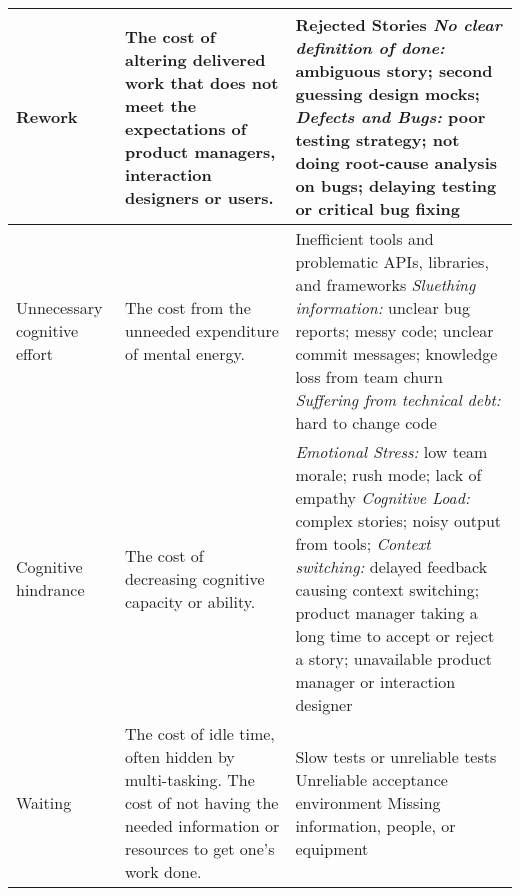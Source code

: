 \begin{table}[t]
\begin{tabular}{|p{1.5in}|p{1.6in}|p{2.8in}|}
Rework                                & The cost of altering delivered work that does not meet the expectations of product managers, interaction designers or users.    & Rejected Stories \newline \textit{No clear definition of done:} ambiguous story; second guessing design mocks; \newline \textit{Defects and Bugs:} poor testing strategy; not doing root-cause analysis on bugs; delaying testing or critical bug fixing                                                                                                                                                                    \\ \hline
Unnecessary cognitive effort          &   The cost from the unneeded expenditure of mental energy.                                                                                                                 & Inefficient tools and problematic APIs, libraries, and frameworks  \newline \textit{Sluething information:} unclear bug reports; messy code; unclear commit messages; knowledge loss from team churn \newline\textit{Suffering from technical debt:} hard to change code
                                                                     \\ \hline
Cognitive hindrance           & The cost of decreasing cognitive capacity or ability.                        & \textit{Emotional Stress:} low team morale; rush mode; lack of empathy \newline \textit{Cognitive Load:} complex stories; noisy output from tools; \newline \textit{Context switching:} delayed feedback causing context switching; product manager taking a long time to accept or reject a story; unavailable product manager or interaction designer                                                                                                                                                        \\ \hline
Waiting                               & The cost of idle time, often hidden by multi-tasking. The cost of not having the needed information or resources to get one's work done. & Slow tests or unreliable tests \newline Unreliable acceptance environment \newline Missing information, people, or equipment                                                                                                                                                                                                                                                                            \\ \hline

\end{tabular}
\end{table}
